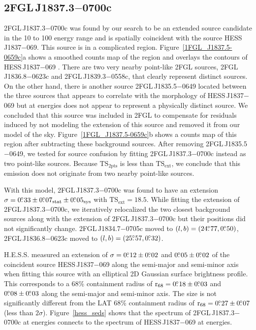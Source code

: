 \documentclass[12pt,preprint]{aastex}
\newcommand{\gev}{\text{GeV}\xspace}
\newcommand{\tev}{\text{TeV}\xspace}
\newcommand{\tsext}{{\ensuremath{\text{TS}_{\text{ext}}}}\xspace}
\newcommand{\tsinc}{\ensuremath{\text{TS}_{\text{2pts}}}\xspace}
\newcommand{\rsixeight}{{\ensuremath{\text{r}_{68}}}\xspace}
\newcommand{\sys}{\text{sys}\xspace}
\newcommand{\stat}{\text{stat}\xspace}
\begin{document}
\subsection{2FGL\,J1837.3$-$0700c}
\label{section_2FGL_J1837.3-0700c}



2FGL\,J1837.3$-$0700c was found by our search to be an extended source
candidate in the 10 \gev to 100 \gev energy range and is spatially
coincident with the \tev source HESS\,J1837$-$069.  This source is
in a complicated region.  Figure~\ref{1FGL_J1837.5-0659c}a shows a
smoothed counts map of the region and overlays the \tev contours of
HESS\,J1837$-$069 \citep{hess_plane_survey}.  There are two very nearby
point-like 2FGL sources, 2FGL\,J1836.8$-$0623c and 2FGL\,J1839.3$-$0558c,
that clearly represent distinct sources.  On the other hand, there is
another source 2FGL\,J1835.5$-$0649 located between the three sources that
appears to correlate with the \tev morphology of HESS\,J1837$-$069 but
at \gev energies
does not appear to represent a physically distinct source.  We concluded
that this source was included in 2FGL to compensate for residuals induced by
not modeling the extension of this source and removed it from our model
of the sky.  Figure~\ref{1FGL_J1837.5-0659c}b shows a
counts map of this region after subtracting these background sources.
After removing 2FGL\,J1835.5$-$0649,
we tested for
source confusion by fitting 
2FGL\,J1837.3$-$0700c
instead as two point-like sources.
Because \tsinc is less than \tsext, we conclude that this emission
does not originate from two nearby point-like sources.

With this model, 2FGL\,J1837.3$-$0700c was found to have an
extension $\sigma=0\fdg33\pm0\fdg07_\stat\pm0\fdg05_\sys$ with 
$\tsext=18.5$. 
While fitting the extension of 2FGL\,J1837.3$-$0700c,
we iteratively relocalized the two closest
background sources along with the extension of 2FGL\,J1837.3$-$0700c but
their positions did not significantly change.  2FGL\,J1834.7$-$0705c
moved to $(l,b)=(24\mbox{$.\!\!^\circ$}77,0\mbox{$.\!\!^\circ$}50)$, 2FGL\,J1836.8$-$0623c moved
to $(l,b)=(25\mbox{$.\!\!^\circ$}57,0\mbox{$.\!\!^\circ$}32)$. 

H.E.S.S. measured an extension of
$\sigma=0\mbox{$.\!\!^\circ$}12\pm0\mbox{$.\!\!^\circ$}02$ and $0\mbox{$.\!\!^\circ$}05\pm0\mbox{$.\!\!^\circ$}02$ 
of the coincident \tev source HESS\,J1837$-$069 
along the semi-major and semi-minor axis when fitting this source
with an elliptical 2D Gaussian surface brightness profile.  This corresponds
to a 68\% containment radius of $\rsixeight=0\fdg18\pm0\fdg03$ and
$0\mbox{$.\!\!^\circ$}08\pm0\mbox{$.\!\!^\circ$}03$ along the semi-major and semi-minor axis. The
size is not significantly different from the LAT 68\% containment
radius of $\rsixeight=0\fdg27\pm0\fdg07$ (less than $2\sigma$).
Figure~\ref{hess_seds} shows that the spectrum of 2FGL\,J1837.3$-$0700c
at \gev energies connects to the spectrum of HESS\,J1837$-$069 at \tev
energies.
\end{document}
